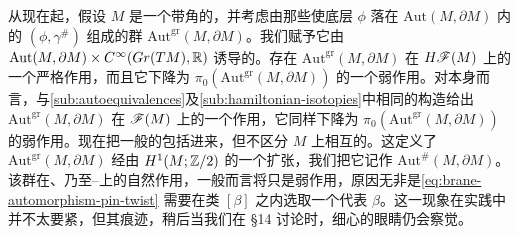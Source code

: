 从现在起，假设 $M$ 是一个带角的\trExactSymplectic\trManifold，并考虑由那些使底层 $\phi$ 落在 $\mathrm{Aut}(M,\partial M)$ 内的 $(\phi,\gamma^{\#})$ 组成的群 $\mathrm{Aut}^{\mathrm{gr}}(M,\partial M)$。我们赋予它由 $\mathrm{Aut}(M,\partial M)\times C^{\infty}(Gr(TM),\mathbb{R})$ 诱导的\trTopology。存在 $\mathrm{Aut}^{\mathrm{gr}}(M,\partial M)$ 在 $H\mathscr{F}(M)$ 上的一个\trCanonical{}严格作用，而且它下降为 $\pi_0(\mathrm{Aut}^{\mathrm{gr}}(M,\partial M))$ 的一个弱作用。对\trFukayaCategory{}本身而言，与\cref{sub:autoequivalences}及\cref{sub:hamiltonian-isotopies}中相同的构造给出 $\mathrm{Aut}^{\mathrm{gr}}(M,\partial M)$ 在 $\mathscr{F}(M)$ 上的一个\trCoherent{}作用，它同样下降为 $\pi_0(\mathrm{Aut}^{\mathrm{gr}}(M,\partial M))$ 的弱作用。现在把一般的\trBrane\trAutomorphism{}包括进来，但不区分 $M$ 上相互\trIsomorphic{}的\trLineBundle。这定义了 $\mathrm{Aut}^{\mathrm{gr}}(M,\partial M)$ 经由 $H^1(M;\mathbb{Z}/2)$ 的一个扩张，我们把它记作 $\mathrm{Aut}^{\#}(M,\partial M)$。该群在\trFukayaCategory、乃至\trDonaldson--\trFukayaCategory{}上的自然作用，一般而言将只是弱作用，原因无非是\eqref{eq:brane-automorphism-pin-twist} 需要在\trIsomorphism{}类 $[\beta]$ 之内选取一个代表 $\beta$。这一现象在实践中并不太要紧，但其痕迹，稍后当我们在 §14 讨论\trInvolution{}时，细心的眼睛仍会察觉。
